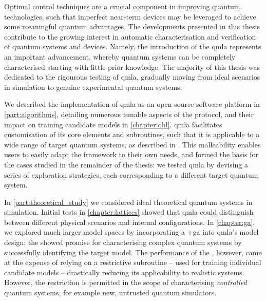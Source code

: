 
Optimal control techniques are a crucial component in improving quantum technologies, 
    such that imperfect near-term devices may be leveraged to achieve some meaningful quantum advantages. 
The developments presented in this thesis contribute to the growing interest in automatic characterisation
    and verification of quantum systems and devices. 
Namely, the introduction of the \gls{qmla} represents an important advancement, 
    whereby quantum systems can be completely characterised starting with little prior knowledge. 
The majority of this thesis was dedicated to the rigourous testing of \gls{qmla},
    gradually moving from ideal scenarios in simulation to genuine experimental quantum systems.
\par

We described the implementation of \gls{qmla} as an open source software platform in \cref{part:algorithms}, 
    detailing numerous tunable aspects of the protocol, and their impact on training candidate models in \cref{chapter:qhl}.
\gls{qmla} facilitates customisation of its core elements and subroutines, 
    such that it is applicable to a wide range of target quantum systems, as described in .
This malleability enables users to easily adapt the framework to their own needs,
    and formed the basis for the cases studied in the remainder of the thesis:
    we tested \gls{qmla} by devising a series of exploration strategies,
    each corresponding to a different target quantum system.

\par 
In \cref{part:theoretical_study} we considered ideal theoretical quantum systems in simulation. 
Initial tests in \cref{chapter:lattices} showed that \gls{qmla} could distinguish between 
    different physical scenarios and internal configurations. 
In \cref{chapter:ga}, we explored much larger \glspl{model space} by incorporating a \glsxtrlong+{ga} into \gls{qmla}'s model design;
    the  showed promise for characterising complex quantum systems by successfully identifying the target model.
The performance of the , however, came at the expense of relying on a restrictive subroutine 
    -- used for training individual candidate models -- 
    drastically reducing its applicability to realistic systems. 
However, the restriction is permitted in the scope of characterising \emph{controlled} quantum systems, 
    for example new, untrusted quantum simulators. 

\par 

